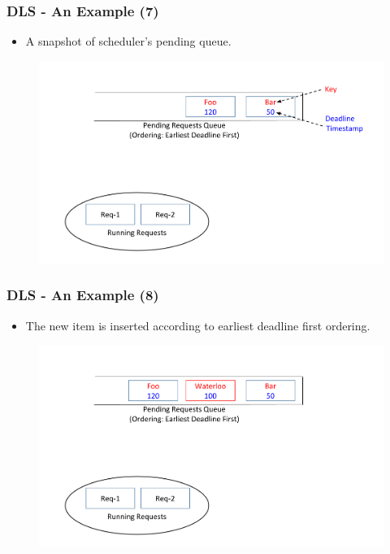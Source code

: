 \documentclass{beamer}
\begin{document}
\begin{frame}
  \frametitle{DLS - An Example (7)}
  \begin{itemize}
  \item A snapshot of scheduler's pending queue.
    \newline
    \newline
  \end{itemize}
  \vspace{-5 mm}
  \begin{figure}
    \begin{center}
      \centerline{\includegraphics[scale=0.33]{img/DLS_Example_ZOOM_1.png}}
    \end{center}
  \end{figure}
\end{frame}

\begin{frame}
  \frametitle{DLS - An Example (8)}
  \begin{itemize}
  \item The new item is inserted according to earliest deadline first ordering.
    \newline
  \end{itemize}
  \vspace{-5 mm}
  \begin{figure}
    \begin{center}
      \centerline{\includegraphics[scale=0.33]{img/DLS_Example_ZOOM_2.png}}
    \end{center}
  \end{figure}
\end{frame}
\end{document}
